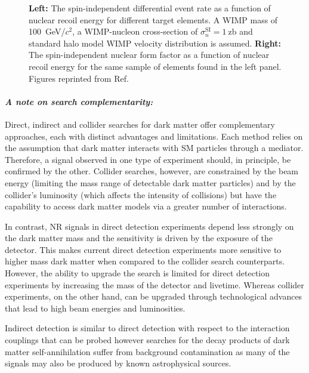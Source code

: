 \begin{figure}[!ht]
\begin{subfigure}{0.49\textwidth}
         \caption{}
         \label{fig:DMOverview/SIFF}
     \end{subfigure}
     \caption[The spin-independent differential event rate and the spin-independent nuclear form factor as a function of nuclear recoil energy for different target elements.]{\textbf{Left:} The spin-independent differential event rate as a function of nuclear recoil energy for different target elements. A WIMP mass of 100~GeV/$c^2$, a WIMP-nucleon cross-section of $\sigma^\text{SI}_n=1~\text{zb}$ and standard halo model WIMP velocity distribution is assumed. \textbf{Right:} The spin-independent nuclear form factor as a function of nuclear recoil energy for the same sample of elements found in the left panel. Figures reprinted from Ref.~\cite{OlcinaSamblas:thesis}}
     \label{fig:DMOverview/SINRRandFF}
\end{figure}

\paragraph{\textit{A note on search complementarity:}} Direct, indirect and collider searches for dark matter offer complementary approaches, each with distinct advantages and limitations. Each method relies on the assumption that dark matter interacts with SM particles through a mediator. Therefore, a signal observed in one type of experiment should, in principle, be confirmed by the other. Collider searches, however, are constrained by the beam energy (limiting the mass range of detectable dark matter particles) and by the collider's luminosity (which affects the intensity of collisions) but have the capability to access dark matter models via a greater number of interactions.

In contrast, NR signals in direct detection experiments depend less strongly on the dark matter mass and the sensitivity is driven by the exposure of the detector. This makes current direct detection experiments more sensitive to higher mass dark matter when compared to the collider search counterparts. However, the ability to upgrade the search is limited for direct detection experiments by increasing the mass of the detector and livetime. Whereas collider experiments, on the other hand, can be upgraded through technological advances that lead to high beam energies and luminosities.

Indirect detection is similar to direct detection with respect to the interaction couplings that can be probed however searches for the decay products of dark matter self-annihilation suffer from background contamination as many of the signals may also be produced by known astrophysical sources.

